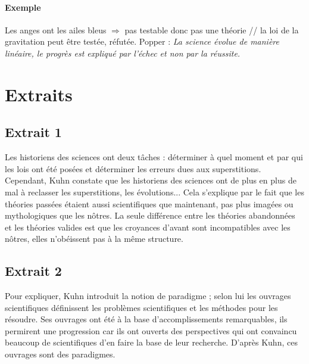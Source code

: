\documentclass[11pt,a4paper]{article} %
\begin{document}
\paragraph{Exemple}
Les anges ont les ailes bleus $\Rightarrow$ pas testable donc pas une théorie // la loi de la gravitation peut être testée, réfutée.
Popper : \emph{La science évolue de manière linéaire, le progrès est expliqué par l'échec et non par la réussite.}
\section{Extraits}
\subsection{Extrait 1}
Les historiens des sciences ont deux tâches : déterminer à quel moment et par qui les lois ont été posées et déterminer les erreurs dues aux superstitions.
Cependant, Kuhn constate que les historiens des sciences ont de plus en plus de mal à reclasser les superstitions, les évolutions...
Cela s'explique par le fait que les théories passées étaient aussi scientifiques que maintenant, pas plus imagées ou mythologiques que les nôtres.
La seule différence entre les théories abandonnées et les théories valides est que les croyances d'avant sont incompatibles avec les nôtres, elles n'obéissent pas à la même structure.
\subsection{Extrait 2}
Pour expliquer, Kuhn introduit la notion de paradigme ; selon lui les ouvrages scientifiques définissent les problèmes scientifiques et les méthodes pour les résoudre.
Ses ouvrages ont été à la base d'accomplissements remarquables, ils permirent une progression car ils ont ouverts des perspectives qui ont convaincu beaucoup de scientifiques d'en faire la base de leur recherche.
D'après Kuhn, ces ouvrages sont des paradigmes.
\end{document}

